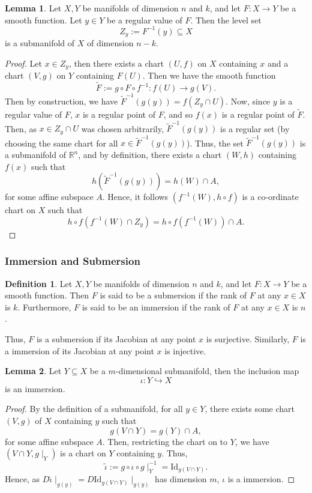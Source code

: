 \documentclass[]{article}
\theoremstyle{definition}
\theoremstyle{definition}
\newtheorem{definition}{Definition}[section]
\newtheorem{lemma}{Lemma}[section]
\begin{document}
\begin{lemma}
  Let \(X, Y\) be manifolds of dimension \(n\) and \(k\), and let \(F : X \to Y\)
  be a smooth function. Let \(y \in Y\) be a regular value of \(F\). Then 
  the level set 
  \[Z_y := F^{-1}(y) \subseteq X\]
  is a submanifold of \(X\) of dimension \(n - k\).
\end{lemma}
\begin{proof}
  Let \(x \in Z_y\), then there exists a chart \((U, f)\) on \(X\) containing 
  \(x\) and a chart \((V, g)\) on \(Y\) containing \(F(U)\). Then we have the 
  smooth function 
  \[\tilde F := g \circ F \circ f^{-1} : f(U) \to g(V).\]
  Then by construction, we have \(\tilde F^{-1}(g(y)) = f(Z_y \cap U)\). Now, 
  since \(y\) is a regular value of \(F\), \(x\) is a regular point of \(F\), and 
  so \(f(x)\) is a regular point of \(\tilde F\). Then, as \(x \in Z_y \cap U\) 
  was chosen arbitrarily, \(\tilde F^{-1}(g(y))\) is a regular set (by choosing the 
  same chart for all \(x \in \tilde F^{-1}(g(y))\)). Thus, the set 
  \(\tilde F^{-1}(g(y))\) is a submanifold of \(\mathbb{R}^n\), and by definition, 
  there exists a chart \((W, h)\) containing \(f(x)\) such that 
  \[h(\tilde F^{-1}(g(y))) = h(W) \cap A,\]
  for some affine subspace \(A\). Hence, it follows \((f^{-1}(W), h \circ f)\) is 
  a co-ordinate chart on \(X\) such that 
  \[h \circ f(f^{-1}(W) \cap Z_y) = h \circ f(f^{-1}(W)) \cap A.\]
\end{proof}

\subsubsection{Immersion and Submersion}

\begin{definition}
  Let \(X, Y\) be manifolds of dimension \(n\) and \(k\), and let \(F : X \to Y\) 
  be a smooth function. Then \(F\) is said to be a submersion if the rank of 
  \(F\) at any \(x \in X\) is \(k\). Furthermore, \(F\) is said to be an 
  immersion if the rank of \(F\) at any \(x \in X\) is \(n\).
\end{definition}

Thus, \(F\) is a submersion if its Jacobian at any point \(x\) is surjective. 
Similarly, \(F\) is a immersion of its Jacobian at any point \(x\) is injective.

\begin{lemma}
  Let \(Y \subseteq X\) be a \(m\)-dimensional submanifold, then the inclusion 
  map 
  \[\iota : Y \hookrightarrow X\]
  is an immersion.
\end{lemma}
\begin{proof}
  By the definition of a submanifold, for all \(y \in Y\), there exists 
  some chart \((V, g)\) of \(X\) containing \(y\) such that 
  \[g(V \cap Y) = g(Y) \cap A,\]
  for some affine subspace \(A\). Then, restricting the chart on to \(Y\), 
  we have \((V \cap Y, g\mid_Y)\) is a chart on \(Y\) containing \(y\). Thus, 
  \[\tilde \iota := g \circ \iota \circ g\mid_Y^{-1} = \text{Id}_{g(V \cap Y)}.\]
  Hence, as \(D \tilde \iota\mid_{g(y)} = D \text{Id}_{g(V \cap Y)}\mid_{g(y)}\) has 
  dimension \(m\), \(\iota\) is a immersion.
\end{proof}
\end{document}

